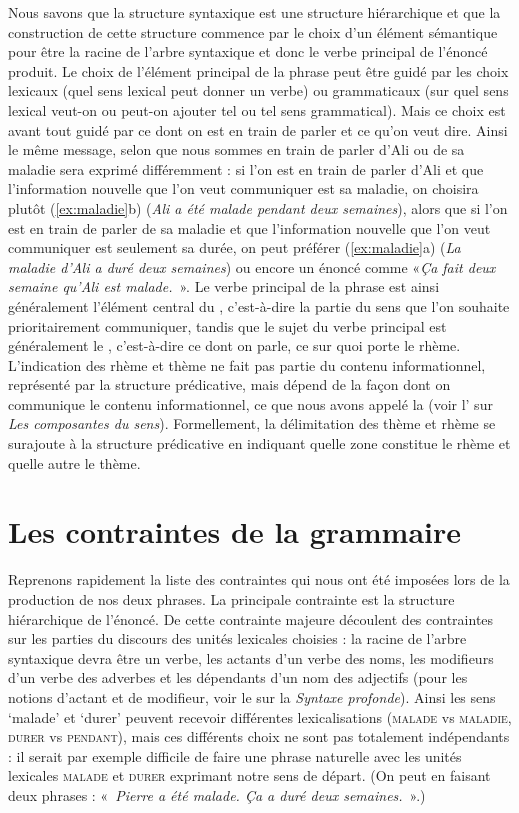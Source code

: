Nous savons que la structure syntaxique est une structure hiérarchique et que la construction de cette structure commence par le choix d’un élément sémantique pour être la racine de l’arbre syntaxique et donc le verbe principal de l’énoncé produit. Le choix de l’élément principal de la phrase peut être guidé par les choix lexicaux (quel sens lexical peut donner un verbe) ou grammaticaux (sur quel sens lexical veut-on ou peut-on ajouter tel ou tel sens grammatical). Mais ce choix est avant tout guidé par ce dont on est en train de parler et ce qu’on veut dire. Ainsi le même message, selon que nous sommes en train de parler d’Ali ou de sa maladie sera exprimé différemment : si l’on est en train de parler d’Ali et que l’information nouvelle que l’on veut communiquer est sa maladie, on choisira plutôt (\ref{ex:maladie}b) (\textit{Ali a été malade pendant deux semaines}), alors que si l’on est en train de parler de sa maladie et que l’information nouvelle que l’on veut communiquer est seulement sa durée, on peut préférer (\ref{ex:maladie}a) (\textit{La maladie d’Ali a duré deux semaines}) ou encore un énoncé comme «\textit{Ça fait deux semaine qu'Ali est malade.}~». Le verbe principal de la phrase est ainsi généralement l’élément central du , c’est-à-dire la partie du sens que l’on souhaite prioritairement communiquer, tandis que le sujet du verbe principal est généralement le , c’est-à-dire ce dont on parle, ce sur quoi porte le rhème. L’indication des rhème et thème ne fait pas partie du contenu informationnel, représenté par la structure prédicative, mais dépend de la façon dont on communique le contenu informationnel, ce que nous avons appelé la  (voir l’ sur \textit{Les composantes du sens}). Formellement, la délimitation des thème et rhème se surajoute à la structure prédicative en indiquant quelle zone constitue le rhème et quelle autre le thème.

\section{Les contraintes de la grammaire}\label{sec:1.2.14}

Reprenons rapidement la liste des contraintes qui nous ont été imposées lors de la production de nos deux phrases. La principale contrainte est la structure hiérarchique de l’énoncé. De cette contrainte majeure découlent des contraintes sur les parties du discours des unités lexicales choisies : la racine de l’arbre syntaxique devra être un verbe, les actants d’un verbe des noms, les modifieurs d’un verbe des adverbes et les dépendants d’un nom des adjectifs (pour les notions d’actant et de modifieur, voir le  sur la \textit{Syntaxe profonde}). Ainsi les sens ‘malade’ et ‘durer’ peuvent recevoir différentes lexicalisations (\textsc{malade} vs \textsc{maladie}, \textsc{durer} vs \textsc{pendant}), mais ces différents choix ne sont pas totalement indépendants : il serait par exemple difficile de faire une phrase naturelle avec les unités lexicales \textsc{malade} et \textsc{durer} exprimant notre sens de départ. (On peut en faisant deux phrases : «~\textit{Pierre a été malade. Ça a duré deux semaines.}~».)

